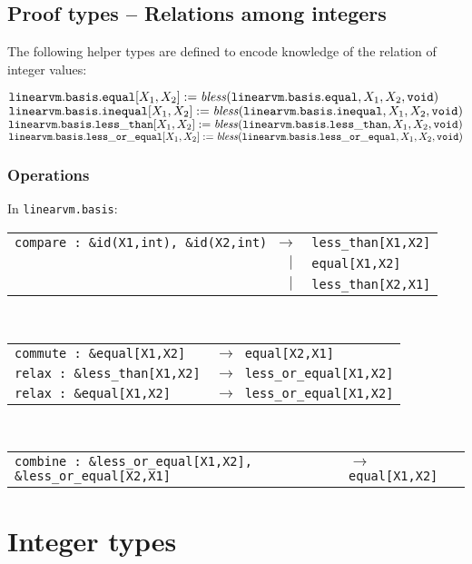 \documentclass[a4paper]{book}
\newcommand\tyBless{{\ensuremath{\textnormal{\textit{bless}}}}}
\begin{document}
\section{Proof types -- Relations among integers}

The following helper types are defined to encode knowledge of the relation of
integer values:

\medskip
\noindent
$\mathtt{linearvm.basis.equal}[X_1,X_2] := \tyBless(\mathtt{linearvm.basis.equal}, X_1,X_2, \mathtt{void})$
$\mathtt{linearvm.basis.inequal}[X_1,X_2] := \tyBless(\mathtt{linearvm.basis.inequal}, X_1,X_2, \mathtt{void})$
$\mathtt{linearvm.basis.less\_than}[X_1,X_2] := \tyBless(\mathtt{linearvm.basis.less\_than}, X_1,X_2, \mathtt{void})$
$\mathtt{linearvm.basis.less\_or\_equal}[X_1,X_2] := \tyBless(\mathtt{linearvm.basis.less\_or\_equal}, X_1,X_2, \mathtt{void})$

\subsection*{Operations}

In \texttt{linearvm.basis}:\\
\begin{tabular}{r@{}l}
\texttt{compare : \&id(X1,int), \&id(X2,int) $\to$}
& \texttt{less\_than[X1,X2]}\\
$|\;$ & \texttt{equal[X1,X2]}\\
$|\;$ & \texttt{less\_than[X2,X1]}\\
\end{tabular}
\\
\begin{tabular}{l@{}l}
\texttt{commute : \&equal[X1,X2]} & \texttt{$\to$ equal[X2,X1]}\\
\texttt{relax : \&less\_than[X1,X2]} & \texttt{$\to$ less\_or\_equal[X1,X2]}\\
\texttt{relax : \&equal[X1,X2]} & \texttt{$\to$ less\_or\_equal[X1,X2]}\\
\end{tabular}
\\
\begin{tabular}{l@{}l}
\texttt{combine : \&less\_or\_equal[X1,X2], \&less\_or\_equal[X2,X1]}
& \texttt{$\to$ equal[X1,X2]}\\
\end{tabular}

\chapter{Integer types}
\end{document}
